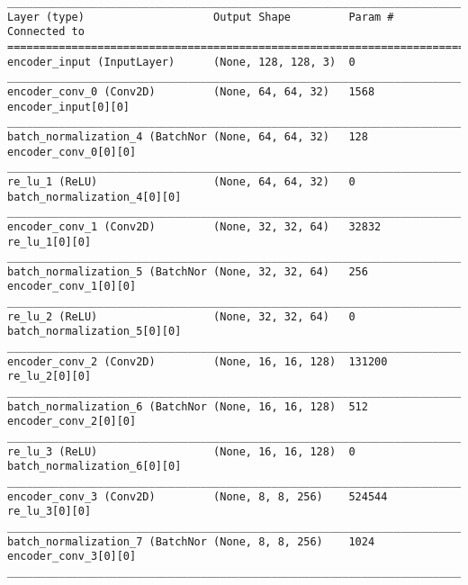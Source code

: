 \begin{lstlisting}[caption={CelebA-\ac{VAE}-\ac{GAN} Encoder},captionpos=b,basicstyle=\tiny, label={lst:mnist-vae-encoder}]
__________________________________________________________________________________________________
Layer (type)                    Output Shape         Param #     Connected to
==================================================================================================
encoder_input (InputLayer)      (None, 128, 128, 3)  0
__________________________________________________________________________________________________
encoder_conv_0 (Conv2D)         (None, 64, 64, 32)   1568        encoder_input[0][0]
__________________________________________________________________________________________________
batch_normalization_4 (BatchNor (None, 64, 64, 32)   128         encoder_conv_0[0][0]
__________________________________________________________________________________________________
re_lu_1 (ReLU)                  (None, 64, 64, 32)   0           batch_normalization_4[0][0]
__________________________________________________________________________________________________
encoder_conv_1 (Conv2D)         (None, 32, 32, 64)   32832       re_lu_1[0][0]
__________________________________________________________________________________________________
batch_normalization_5 (BatchNor (None, 32, 32, 64)   256         encoder_conv_1[0][0]
__________________________________________________________________________________________________
re_lu_2 (ReLU)                  (None, 32, 32, 64)   0           batch_normalization_5[0][0]
__________________________________________________________________________________________________
encoder_conv_2 (Conv2D)         (None, 16, 16, 128)  131200      re_lu_2[0][0]
__________________________________________________________________________________________________
batch_normalization_6 (BatchNor (None, 16, 16, 128)  512         encoder_conv_2[0][0]
__________________________________________________________________________________________________
re_lu_3 (ReLU)                  (None, 16, 16, 128)  0           batch_normalization_6[0][0]
__________________________________________________________________________________________________
encoder_conv_3 (Conv2D)         (None, 8, 8, 256)    524544      re_lu_3[0][0]
__________________________________________________________________________________________________
batch_normalization_7 (BatchNor (None, 8, 8, 256)    1024        encoder_conv_3[0][0]
__________________________________________________________________________________________________

\end{lstlisting}
